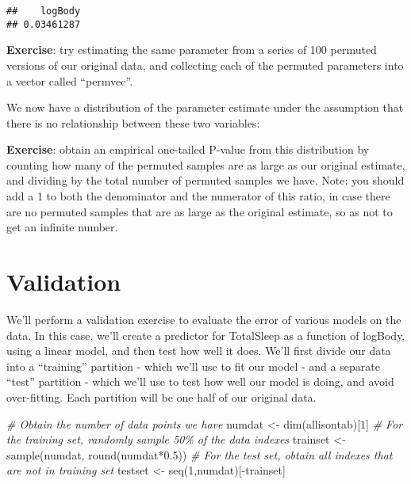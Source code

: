 \documentclass[
]{book}
\newenvironment{Shaded}{\begin{snugshade}}{\end{snugshade}}
\newcommand{\AttributeTok}[1]{\textcolor[rgb]{0.77,0.63,0.00}{#1}}
\newcommand{\CommentTok}[1]{\textcolor[rgb]{0.56,0.35,0.01}{\textit{#1}}}
\newcommand{\DecValTok}[1]{\textcolor[rgb]{0.00,0.00,0.81}{#1}}
\newcommand{\FloatTok}[1]{\textcolor[rgb]{0.00,0.00,0.81}{#1}}
\newcommand{\FunctionTok}[1]{\textcolor[rgb]{0.00,0.00,0.00}{#1}}
\newcommand{\NormalTok}[1]{#1}
\newcommand{\OtherTok}[1]{\textcolor[rgb]{0.56,0.35,0.01}{#1}}
\newcommand{\SpecialCharTok}[1]{\textcolor[rgb]{0.00,0.00,0.00}{#1}}
\begin{document}
\begin{Shaded}
\end{Shaded}

\begin{verbatim}
##    logBody 
## 0.03461287
\end{verbatim}

\textbf{Exercise}: try estimating the same parameter from a series of 100 permuted versions of our original data, and collecting each of the permuted parameters into a vector called ``permvec''.

We now have a distribution of the parameter estimate under the assumption that there is no relationship between these two variables:

\textbf{Exercise}: obtain an empirical one-tailed P-value from this distribution by counting how many of the permuted samples are as large as our original estimate, and dividing by the total number of permuted samples we have. Note: you should add a 1 to both the denominator and the numerator of this ratio, in case there are no permuted samples that are as large as the original estimate, so as not to get an infinite number.

\hypertarget{validation}{%
\section{Validation}\label{validation}}

We'll perform a validation exercise to evaluate the error of various models on the data. In this case, we'll create a predictor for TotalSleep as a function of logBody, using a linear model, and then test how well it does. We'll first divide our data into a ``training'' partition - which we'll use to fit our model - and a separate ``test'' partition - which we'll use to test how well our model is doing, and avoid over-fitting. Each partition will be one half of our original data.

\begin{Shaded}
\begin{Highlighting}[]
\CommentTok{\# Obtain the number of data points we have}
\NormalTok{numdat }\OtherTok{\textless{}{-}} \FunctionTok{dim}\NormalTok{(allisontab)[}\DecValTok{1}\NormalTok{]}
\CommentTok{\# For the training set, randomly sample 50\% of the data indexes}
\NormalTok{trainset }\OtherTok{\textless{}{-}} \FunctionTok{sample}\NormalTok{(numdat, }\FunctionTok{round}\NormalTok{(numdat}\SpecialCharTok{*}\FloatTok{0.5}\NormalTok{))}
\CommentTok{\# For the test set, obtain all indexes that are not in training set}
\NormalTok{testset }\OtherTok{\textless{}{-}} \FunctionTok{seq}\NormalTok{(}\DecValTok{1}\NormalTok{,numdat)[}\SpecialCharTok{{-}}\NormalTok{trainset]}
\end{Highlighting}
\end{Shaded}
\end{document}
